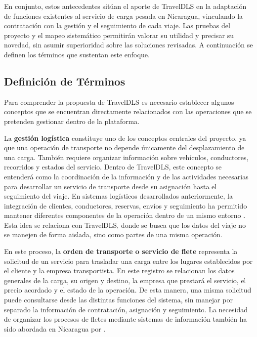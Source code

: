 En conjunto, estos antecedentes sitúan el aporte de TravelDLS en la adaptación de funciones existentes al servicio de carga pesada en Nicaragua, vinculando la contratación con la gestión y el seguimiento de cada viaje. Las pruebas del proyecto y el mapeo sistemático permitirán valorar su utilidad y precisar su novedad, sin asumir superioridad sobre las soluciones revisadas. A continuación se definen los términos que sustentan este enfoque.

\subsection{Definición de Términos}

Para comprender la propuesta de TravelDLS es necesario establecer algunos conceptos que se encuentran directamente relacionados con las operaciones que se pretenden gestionar dentro de la plataforma.

La \hypertarget{concepto-gestion-logistica}{\textbf{gestión logística}} constituye uno de los conceptos centrales del proyecto, ya que una operación de transporte no depende únicamente del desplazamiento de una carga. También requiere organizar información sobre vehículos, conductores, recorridos y estados del servicio. Dentro de TravelDLS, este concepto se entenderá como la coordinación de la información y de las actividades necesarias para desarrollar un servicio de transporte desde su asignación hasta el seguimiento del viaje. En sistemas logísticos desarrollados anteriormente, la integración de clientes, conductores, reservas, envíos y seguimiento ha permitido mantener diferentes componentes de la operación dentro de un mismo entorno \parencite[pp. 1-4]{sultan2022real}. Esta idea se relaciona con TravelDLS, donde se busca que los datos del viaje no se manejen de forma aislada, sino como partes de una misma operación.


En este proceso, la \hypertarget{concepto-orden}{\textbf{orden de transporte o servicio de flete}} representa la solicitud de un servicio para trasladar una carga entre los lugares establecidos por el cliente y la empresa transportista. En este registro se relacionan los datos generales de la carga, su origen y destino, la empresa que prestará el servicio, el precio acordado y el estado de la operación. De esta manera, una misma solicitud puede consultarse desde las distintas funciones del sistema, sin manejar por separado la información de contratación, asignación y seguimiento. La necesidad de organizar los procesos de fletes mediante sistemas de información también ha sido abordada en Nicaragua por \textcite{aragon2018implementacion}.

